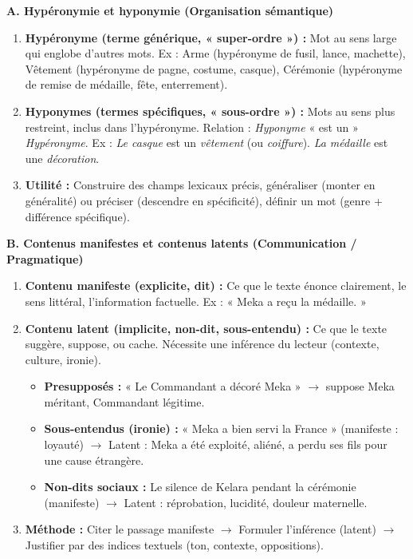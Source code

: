 \documentclass[11pt]{article}
\newcommand{\cle}[1]{{\popxbold\color{popdark}#1}}
\begin{document}
\begin{methode}
\textbf{A. Hypéronymie et hyponymie (Organisation sémantique)}
\begin{enumerate}
    \item \textbf{Hypéronyme (terme générique, « super-ordre ») :} Mot au sens large qui englobe d'autres mots. Ex : \cle{Arme} (hypéronyme de fusil, lance, machette), \cle{Vêtement} (hypéronyme de pagne, costume, casque), \cle{Cérémonie} (hypéronyme de remise de médaille, fête, enterrement).
    \item \textbf{Hyponymes (termes spécifiques, « sous-ordre ») :} Mots au sens plus restreint, inclus dans l'hypéronyme. Relation : \emph{Hyponyme} « est un » \emph{Hypéronyme}. Ex : \emph{Le casque} est un \emph{vêtement} (ou \emph{coiffure}). \emph{La médaille} est une \emph{décoration}.
    \item \textbf{Utilité :} Construire des champs lexicaux précis, généraliser (monter en généralité) ou préciser (descendre en spécificité), définir un mot (genre + différence spécifique).
\end{enumerate}

\textbf{B. Contenus manifestes et contenus latents (Communication / Pragmatique)}
\begin{enumerate}
    \item \textbf{Contenu manifeste (explicite, dit) :} Ce que le texte énonce clairement, le sens littéral, l'information factuelle. Ex : « Meka a reçu la médaille. »
    \item \textbf{Contenu latent (implicite, non-dit, sous-entendu) :} Ce que le texte suggère, suppose, ou cache. Nécessite une inférence du lecteur (contexte, culture, ironie).
    \begin{itemize}
        \item \textbf{Presupposés :} « Le Commandant a décoré Meka » $\to$ suppose Meka méritant, Commandant légitime.
        \item \textbf{Sous-entendus (ironie) :} « Meka a bien servi la France » (manifeste : loyauté) $\to$ Latent : Meka a été exploité, aliéné, a perdu ses fils pour une cause étrangère.
        \item \textbf{Non-dits sociaux :} Le silence de Kelara pendant la cérémonie (manifeste) $\to$ Latent : réprobation, lucidité, douleur maternelle.
    \end{itemize}
    \item \textbf{Méthode :} Citer le passage manifeste $\to$ Formuler l'inférence (latent) $\to$ Justifier par des indices textuels (ton, contexte, oppositions).
\end{enumerate}


\end{methode}
\end{document}
